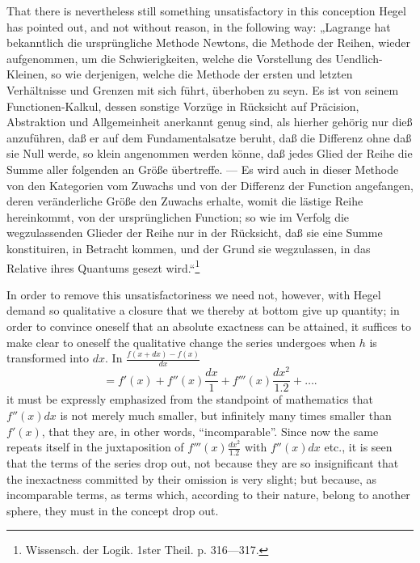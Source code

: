 \documentclass[12pt,a4paper,openany]{book}
\newcommand{\opage}[1]{\marginnote{\footnotesize\textit{[#1]}}}
\begin{document}
That there is nevertheless still something unsatisfactory in this conception
Hegel has pointed out, and not without reason, in the
following way: „Lagrange hat bekanntlich die ursprüngliche
Methode Newtons, die Methode der Reihen, wieder aufgenommen,
um die Schwierigkeiten, welche die Vorstellung
des Uendlich-Kleinen, so wie derjenigen, welche die Methode
der ersten und letzten Verhältnisse und Grenzen mit sich
führt, überhoben zu seyn. Es ist von seinem Functionen-Kalkul,
dessen sonstige Vorzüge in Rücksicht auf Präcision,
Abstraktion und Allgemeinheit anerkannt genug sind, als
hierher gehörig nur dieß anzuführen, daß er auf dem Fundamentalsatze
beruht, daß die Differenz ohne daß sie Null
werde, so klein angenommen werden könne, daß
jedes Glied der Reihe die Summe aller folgenden
an Größe übertreffe. --- Es wird auch in dieser Methode
von den Kategorien vom Zuwachs und von der Differenz
der Function angefangen, deren veränderliche Größe
den Zuwachs erhalte, womit die lästige Reihe hereinkommt,
von der ursprünglichen Function; so wie im Verfolg die
wegzulassenden Glieder der Reihe nur in der Rücksicht, daß
sie eine Summe konstituiren, in Betracht kommen, und der
\setcounter{footnote}{0}%
\opage{96}Grund sie wegzulassen, in das Relative ihres Quantums
gesezt wird.“\footnote[1]{Wissensch. der Logik. 1ster Theil. p. 316—317.}

In order to remove this unsatisfactoriness we need not, however, %
with Hegel demand so qualitative a closure that we
thereby at bottom give up quantity; in order to convince
oneself that an absolute exactness can be attained, it suffices
to make clear to oneself the qualitative change the series
undergoes when $h$ is transformed into $dx$. In $\frac{f(x+dx)-f(x)}{dx}$
\[ =f'(x)+f''(x)\frac{dx}{1}+f'''(x)\frac{dx^{2}}{1.2}+\ldots. \]
it must be expressly emphasized from the standpoint of
mathematics that $f''(x)dx$ is not merely much smaller, but infinitely many times smaller than $f'(x)$, that they are, in other words, ``incomparable''.
Since now the same repeats itself in the juxtaposition of $f'''(x)\frac{dx^{2}}{1.2}$ with $f''(x)dx$ etc., it is seen that the terms
of the series drop out, not because they are so insignificant that the inexactness
committed by their omission is very slight;
but because, as incomparable terms, as terms which,
according to their nature, belong to another
sphere, they must in the concept drop out.
\end{document}
